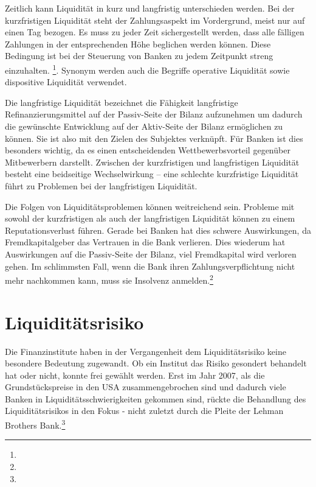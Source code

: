\begin{onehalfspacing}
Zeitlich kann Liquidität in kurz und langfristig unterschieden werden. Bei der kurzfristigen Liquidität steht der Zahlungsaspekt im Vordergrund, meist nur auf einen Tag bezogen. Es muss zu jeder Zeit sichergestellt werden, dass alle fälligen Zahlungen in der entsprechenden Höhe beglichen werden können. Diese Bedingung ist bei der Steuerung von Banken zu jedem Zeitpunkt streng einzuhalten. \footnote{ }. Synonym werden auch die Begriffe operative Liquidität sowie dispositive Liquidität verwendet.

Die langfristige Liquidität bezeichnet die Fähigkeit langfristige Refinanzierungsmittel auf der Passiv-Seite der Bilanz aufzunehmen um dadurch die gewünschte Entwicklung auf der Aktiv-Seite der Bilanz ermöglichen zu können. Sie ist also mit den Zielen des Subjektes verknüpft. Für Banken ist dies besonders wichtig, da es einen entscheidenden Wettbewerbsvorteil gegenüber Mitbewerbern darstellt. Zwischen der kurzfristigen und langfristigen Liquidität besteht eine beidseitige Wechselwirkung -- eine schlechte kurzfristige Liquidität führt zu Problemen bei der langfristigen Liquidität.

Die Folgen von Liquiditätsproblemen können weitreichend sein. Probleme mit sowohl der kurzfristigen als auch der langfristigen Liquidität können zu einem Reputationsverlust führen. Gerade bei Banken hat dies schwere Auswirkungen, da Fremdkapitalgeber das Vertrauen in die Bank verlieren. Dies wiederum hat Auswirkungen auf die Passiv-Seite der Bilanz, viel Fremdkapital wird verloren gehen. Im schlimmsten Fall, wenn die Bank ihren Zahlungsverpflichtung nicht mehr nachkommen kann, muss sie Insolvenz anmelden.\footnote{ }

\section{Liquiditätsrisiko}
Die Finanzinstitute haben in der Vergangenheit dem Liquiditätsrisiko keine besondere Bedeutung zugewandt. Ob ein Institut das Risiko gesondert behandelt hat oder nicht, konnte frei gewählt werden. Erst im Jahr 2007, als die Grundstückspreise in den USA zusammengebrochen sind und dadurch viele Banken in Liquiditätsschwierigkeiten gekommen sind, rückte die Behandlung des Liquiditätsrisikos in den Fokus - nicht zuletzt durch die Pleite der Lehman Brothers Bank.\footnote{ }



\end{onehalfspacing}
